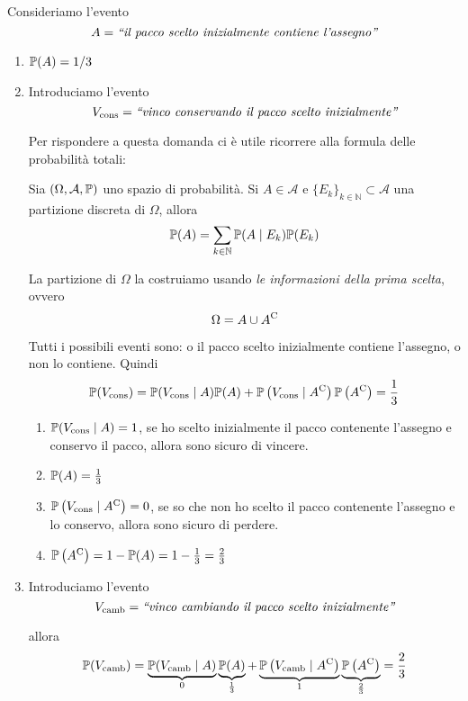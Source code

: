 Consideriamo l'evento
\begin{equation*}
	A=\emph{``il pacco scelto inizialmente contiene l'assegno''}
\end{equation*}
\begin{enumerate}
	\item $\mathbb{P}(A) =1/3$
	\item Introduciamo l'evento
	\begin{equation*}
	V_{\text{cons}} =\emph{``vinco conservando il pacco scelto inizialmente''}
	\end{equation*}

	Per rispondere a questa domanda ci è utile ricorrere alla formula delle probabilità totali:\begin{theorem}
	Sia $(\Omega ,\mathcal{A} ,\mathbb{P})$ uno spazio di probabilità. Si $A\in \mathcal{A}$ e $\{E_{k}\}_{k\in \mathbb{N}} \subset \mathcal{A}$ una partizione discreta di $\Omega $, allora
	\begin{equation*}
	\mathbb{P}(A) =\sum\limits _{k\in \mathbb{N}}\mathbb{P}(A\mid E_{k})\mathbb{P}(E_{k})
	\end{equation*}
	\end{theorem}

	La partizione di $\Omega $ la costruiamo usando \textit{le informazioni della prima scelta}, ovvero
	\begin{equation*}
	\Omega =A\cup A^{\mathrm{C}}
	\end{equation*}

	Tutti i possibili eventi sono: o il pacco scelto inizialmente contiene l'assegno, o non lo contiene. Quindi
	\begin{equation*}
	\mathbb{P}(V_{\text{cons}}) =\mathbb{P}(V_{\text{cons}} \mid A)\mathbb{P}(A) +\mathbb{P}\left(V_{\text{cons}} \mid A^{\mathrm{C}}\right)\mathbb{P}\left(A^{\mathrm{C}}\right) =\frac{1}{3}
	\end{equation*}
	\begin{enumerate}
	\item $\mathbb{P}(V_{\text{cons}} \mid A) =1$, se ho scelto inizialmente il pacco contenente l'assegno e conservo il pacco, allora sono sicuro di vincere.
	\item $\mathbb{P}(A) =\frac{1}{3}$
	\item $\mathbb{P}\left(V_{\text{cons}} \mid A^{\mathrm{C}}\right) =0$, se so che non ho scelto il pacco contenente l'assegno e lo conservo, allora sono sicuro di perdere.
	\item $\mathbb{P}\left(A^{\mathrm{C}}\right) =1-\mathbb{P}(A) =1-\frac{1}{3} =\frac{2}{3}$
	\end{enumerate}
	\item Introduciamo l'evento
	\begin{equation*}
	V_{\text{camb}} =\emph{``vinco cambiando il pacco scelto inizialmente''}
	\end{equation*}

	allora
	\begin{equation*}
	\mathbb{P}(V_{\text{camb}}) =\underbrace{\mathbb{P}(V_{\text{camb}} \mid A)}_{0}\underbrace{\mathbb{P}(A)}_{\frac{1}{3}} +\underbrace{\mathbb{P}\left(V_{\text{camb}} \mid A^{\mathrm{C}}\right)}_{1}\underbrace{\mathbb{P}\left(A^{\mathrm{C}}\right)}_{\frac{2}{3}} =\frac{2}{3}
	\end{equation*}
\end{enumerate}

